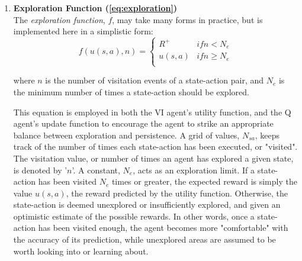 \documentclass[12pt, letter]{article}
\begin{document}
\begin{enumerate}[rightmargin=.1\linewidth-\leftmargin\relax]
    \item \textbf{Exploration Function (\ref{eq:exploration})\cite{textbook}}\\
        The \emph{exploration function}, $f$, may take many forms in practice, but is implemented here in a simplistic form:
        \\
        \begin{equation} \label{eq:exploration}
            f(u(s,a),n)=\left\{\begin{matrix}
            R^+ & if n < N_e\\ 
            u(s,a) & if n \geq N_e\\
            \end{matrix}\right.
        \end{equation}
        \begin{small} \begin{changemargin}{1cm}{1cm}
        where $n$ is the number of visitation events of a state-action pair, and $N_e$ is the minimum number of times a state-action should be explored.
        \end{changemargin} \end{small}
        
        This equation is employed in both the VI agent's utility function, and the Q agent's update function to encourage the agent to strike an appropriate balance between exploration and persistence.  A grid of values, $N_{sa}$, keeps track of the number of times each state-action has been executed, or "visited".  The visitation value, or number of times an agent has explored a given state, is denoted by '$n$'.  A constant, $N_e$, acts as an exploration limit.  If a state-action has been visited $N_e$ times or greater, the expected reward is simply the value $u(s,a)$, the reward predicted by the utility function.  Otherwise, the state-action is deemed unexplored or insufficiently explored, and given an optimistic estimate of the possible rewards.  In other words, once a state-action has been visited enough, the agent becomes more "comfortable" with the accuracy of its prediction, while unexplored areas are assumed to be worth looking into or learning about.
    

\end{enumerate}
\end{document}
